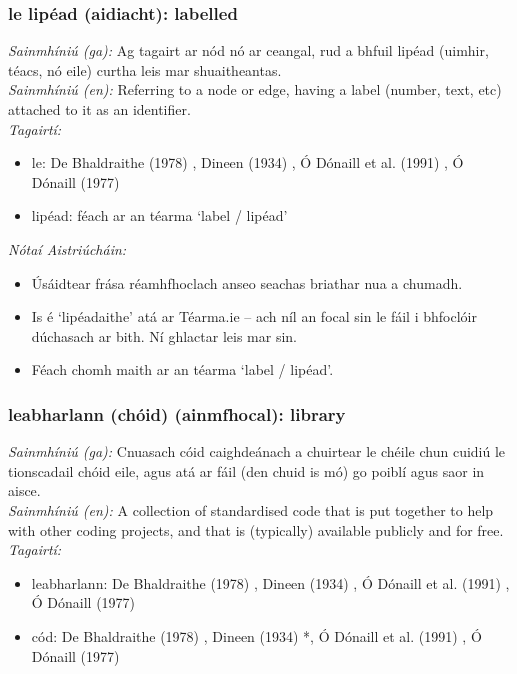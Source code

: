 \subsubsection*{le lipéad (aidiacht): labelled}
 \noindent \textit{Sainmhíniú (ga):} Ag tagairt ar nód nó ar ceangal, rud a bhfuil lipéad (uimhir, téacs, nó eile) curtha leis mar shuaitheantas.
\\
 \noindent \textit{Sainmhíniú (en):} Referring to a node or edge, having a label (number, text, etc) attached to it as an identifier.
\\
 \noindent \textit{Tagairtí:}
\begin{itemize}
	\item le: De Bhaldraithe (1978) \cite{de-bhaldraithe}, Dineen (1934) \cite{dineen}, Ó Dónaill et al. (1991) \cite{focloir-beag}, Ó Dónaill (1977) \cite{odonaill}
	\item lipéad: féach ar an téarma `label / lipéad'
\end{itemize}

 \noindent \textit{Nótaí Aistriúcháin:}
\begin{itemize}
	\item Úsáidtear frása réamhfhoclach anseo seachas briathar nua a chumadh.
	\item Is é `lipéadaithe' atá ar Téarma.ie -- ach níl an focal sin le fáil i bhfoclóir dúchasach ar bith. Ní ghlactar leis mar sin.
	\item Féach chomh maith ar an téarma `label / lipéad'.
\end{itemize}


\subsubsection*{leabharlann (chóid) (ainmfhocal): library}
 \noindent \textit{Sainmhíniú (ga):} Cnuasach cóid caighdeánach a chuirtear le chéile chun cuidiú le tionscadail chóid eile, agus atá ar fáil (den chuid is mó) go poiblí agus saor in aisce.
\\
 \noindent \textit{Sainmhíniú (en):} A collection of standardised code that is put together to help with other coding projects, and that is (typically) available publicly and for free.
\\
 \noindent \textit{Tagairtí:}
\begin{itemize}
	\item leabharlann: De Bhaldraithe (1978) \cite{de-bhaldraithe}, Dineen (1934) \cite{dineen}, Ó Dónaill et al. (1991) \cite{focloir-beag}, Ó Dónaill (1977) \cite{odonaill}
	\item cód: De Bhaldraithe (1978) \cite{de-bhaldraithe}, Dineen (1934) \cite{dineen}*, Ó Dónaill et al. (1991) \cite{focloir-beag}, Ó Dónaill (1977) \cite{odonaill}
\end{itemize}

